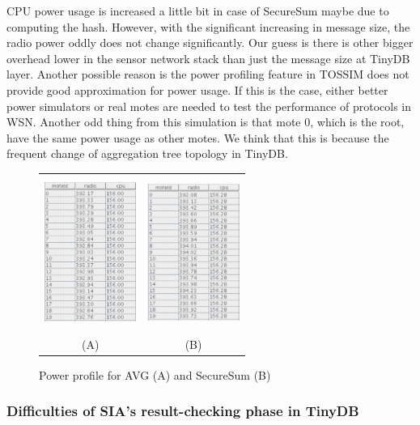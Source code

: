 \documentclass[a4paper]{article}
\begin{document}
CPU power usage is
increased a little bit in case of SecureSum maybe due to computing the hash. However,
with the significant increasing in message size, the radio power oddly does not change
significantly. Our guess is there is other bigger overhead lower in the sensor network 
stack than just the message size at TinyDB layer. Another possible reason is
the power profiling feature in TOSSIM does not provide good approximation for power
usage. If  this is the case, either better power simulators or real motes are needed to
test the performance of protocols in WSN. Another odd thing from this simulation is that
mote 0, which is the root, have the same power usage as other motes. We think that this 
is because the frequent change of aggregation tree topology in TinyDB.

\begin{figure}
\centering
  \begin{tabular}{cc}
\includegraphics[width=3cm, height=5cm]{power_usage_avg_op}&\includegraphics[width=3cm,
  height=5cm]{power_usage_with_sha1}\\
    (A) & (B) \\
  \end{tabular}
\caption{Power profile for AVG (A) and SecureSum (B)} 
\label{fig:avg}
\end{figure}

\subsubsection{Difficulties of SIA's result-checking phase in TinyDB}
\end{document}
